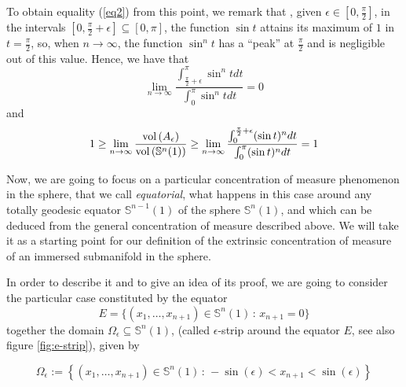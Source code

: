 \documentclass{amsart}
\theoremstyle{definition}
\theoremstyle{remark}
\begin{document}
To obtain equality (\ref{eq2}) from this point, we remark that , given $\epsilon \in [0,\frac{\pi}{2}]$,  in the intervals $[0, \frac{\pi}{2}+\epsilon] \subseteq [0,\pi]$, the function $\sin t$ attains its maximum of $1$ in $t=\frac{\pi}{2}$, so, when $n \to \infty$, the function $\sin^n t$ has a ``peak'' at $\frac{\pi}{2}$ and is negligible out of this value. Hence, we have that
\begin{equation}
 \lim_{n \to \infty}\frac{\int_{\frac{\pi}{2}+\epsilon}^{\pi} \sin^n t dt }{\int _0^\pi \sin^n t dt }=0
\end{equation}
\noindent and
\begin{equation}
1\geq \lim_{n \to \infty} \frac{{\rm vol}\left(A_\epsilon\right)}{{\rm vol}\left(\mathbb{S}^n(1)\right)}\geq  \lim_{n \to \infty} \frac{\int _0^{\frac{\pi}{2}+\epsilon} (\sin t)^n dt }{\int _0^\pi (\sin t)^n dt   }=1
\end{equation}
\medskip

Now, we are going to focus on a particular concentration of measure phenomenon in the sphere, that we call {\em equatorial}, what happens in this case around any totally geodesic equator $\mathbb{S}^{n-1}(1)$ of the sphere $ \mathbb{S}^{n}(1)$, and which can be deduced from the general concentration of measure described above. We will take  it as  a starting point for our definition of the extrinsic concentration of measure of an immersed submanifold in the sphere.

In order to describe it and to give an idea of its proof, we are going to consider the particular case constituted by the equator 
$$E=\{(x_1,\ldots,x_{n+1})\in \mathbb{S}^{n}(1)\, :\, x_{n+1}=0\}$$
together the domain $\Omega_\epsilon \subseteq  \mathbb{S}^{n}(1) $, (called $\epsilon$-strip around the equator $E$, see also figure \ref{fig:e-strip}), given by

\begin{equation*}
\Omega_\epsilon:=\left\lbrace  (x_1,\ldots,x_{n+1})\in \mathbb{S}^{n}(1)\, :\, -\sin(\epsilon)<x_{n+1}<\sin(\epsilon)\right\rbrace
\end{equation*}
\end{document}
